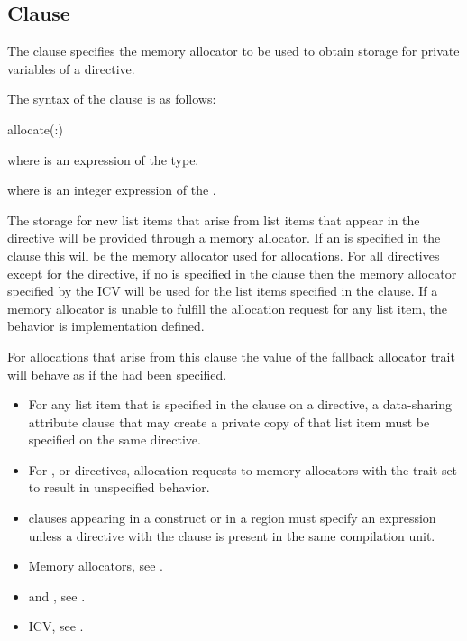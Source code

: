 \subsection{ Clause}
\label{subsec:allocate Clause}
\summary
The  clause specifies the memory allocator to be used to obtain storage for private variables of a directive.

\syntax

The syntax of the  clause is as follows:

\begin{ompSyntax}
allocate(\plc{[allocator}:\plc{] list})
\end{ompSyntax}

\begin{ccppspecific}
where  is an expression of the  type.
\end{ccppspecific}
\begin{fortranspecific}
where  is an integer expression of the  .
\end{fortranspecific}

\descr

The storage for new list items that arise from list items that appear in the directive will be provided through a memory allocator. If an  is specified in the clause this will be the memory allocator used for allocations. For all directives except for the  directive, if no  is specified in the clause then the memory allocator specified by the  ICV will be used for the list items specified in the  clause. If a memory allocator is unable to fulfill the allocation request for any list item, the behavior is implementation defined.

For allocations that arise from this clause the  value of the fallback allocator trait will behave as if the  had been specified.

\restrictions
\begin{itemize}
\item For any list item that is specified in the  clause on a directive, a data-sharing attribute clause that may create a private copy of that list item must be specified on the same directive.
\item For ,  or  directives, allocation requests to memory allocators with the trait  set to  result in unspecified behavior.
\item {} clauses appearing in a  construct or in a  region must specify an  expression unless a  directive with the  clause is present in the same compilation unit.
\end{itemize}

\crossreferences
\begin{itemize}
\item Memory allocators, see .
\item {} and , see .
\item {} ICV, see .
\end{itemize}
